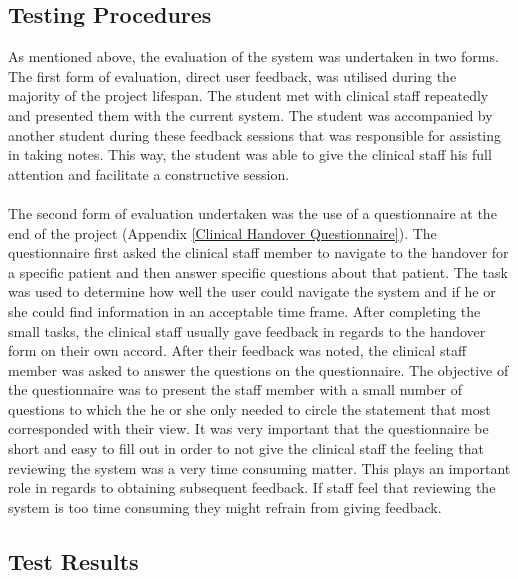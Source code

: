 \subsection{Testing Procedures}
As mentioned above, the evaluation of the system was undertaken in two forms. The first form of evaluation, direct user feedback, was utilised during the majority of the project lifespan. The student met with clinical staff repeatedly and presented them with the current system. The student was accompanied by another student during these feedback sessions that was responsible for assisting in taking notes. This way, the student was able to give the clinical staff his full attention and facilitate a constructive session. 
\\ \\
The second form of evaluation undertaken was the use of a questionnaire at the end of the project (Appendix \ref{Clinical Handover Questionnaire}). The questionnaire first asked the clinical staff member to navigate to the handover for a specific patient and then answer specific questions about that patient. The task was used to determine how well the user could navigate the system and if he or she could find information in an acceptable time frame. After completing the small tasks, the clinical staff usually gave feedback in regards to the handover form on their own accord. After their feedback was noted, the clinical staff member was asked to answer the questions on the questionnaire. The objective of the questionnaire was to present the staff member with a small number of questions to which the he or she only needed to circle the statement that most corresponded with their view. It was very important that the questionnaire be short and easy to fill out in order to not give the clinical staff the feeling that reviewing the system was a very time consuming matter. This plays an important role in regards to obtaining subsequent feedback. If staff feel that reviewing the system is too time consuming they might refrain from giving feedback.

\subsection{Test Results}


